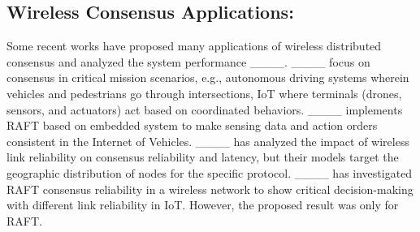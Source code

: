 \subsection{Wireless Consensus Applications: }Some recent works have proposed many applications of wireless distributed consensus and analyzed the system performance ____. 
____ focus on consensus in critical mission scenarios, e.g., autonomous driving systems wherein vehicles and pedestrians go through intersections, IoT where terminals (drones, sensors, and actuators) act based on coordinated behaviors. ____ implements RAFT based on embedded system to make sensing data and action orders consistent in the Internet of Vehicles. 
____ 
has analyzed the impact of wireless link reliability on consensus reliability and latency, but their models target the geographic distribution of nodes for the specific protocol.
____ has investigated RAFT consensus reliability in a wireless network to show critical decision-making with different link reliability in IoT. However, the proposed result was only for RAFT.